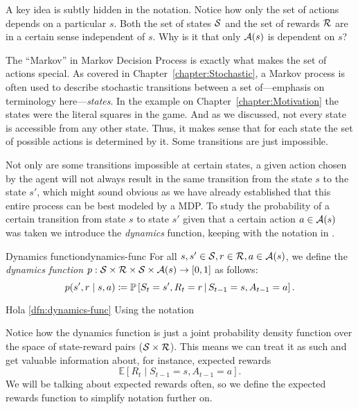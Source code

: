 A key idea is subtly hidden in the notation. Notice how only the set of actions
depends on a particular $s$. Both the set of states $\mathcal{S}$ and the set of
rewards $\mathcal{R}$ are in a certain sense independent of $s$. Why is it that
only $\mathcal{A}(s)$ is dependent on $s$?

The ``Markov'' in Markov Decision Process is exactly what makes the set of
actions special. As covered in Chapter~\ref{chapter:Stochastic}, a Markov
process is often used to describe stochastic transitions between a set 
of---emphasis on terminology here---\textit{states}. In the example on
Chapter~\ref{chapter:Motivation} the states were the literal squares in the
game. And as we discussed, not every state is accessible from any other state.
Thus, it makes sense that for each state the set of possible actions is
determined by it. Some transitions are just impossible.

Not only are some transitions impossible at certain states, a given action
chosen by the agent will not always result in the same transition from the state
$s$ to the state $s'$, which might sound obvious as we have already established
that this entire process can be best modeled by a MDP. To study the probability
of a certain transition from state $s$ to state $s'$ given that a certain action
$a \in \mathcal{A}(s)$ was taken we introduce the \textit{dynamics} function,
keeping with the notation in \cite{SuttonBarto}.

\begin{dfn}{Dynamics function}{dynamics-func}
	For all $s, s' \in \mathcal{S}, r \in \mathcal{R}, a \in 
	\mathcal{A}(s)$, we define the \emph{dynamics function} $p: 
	\mathcal{S} \times \mathcal{R} \times \mathcal{S} \times \mathcal{A}(s) 
	\to [0, 1]$ as follows:
	\begin{equation*}
		p(s', r \mid s, a) \coloneqq \mathbb{P}\left[S_t = s', R_t = r 
		\,\middle\vert\, S_{t-1} = s, A_{t-1} = a\right].
	\end{equation*}
\end{dfn}

Hola \ref{dfn:dynamics-func}
Using the notation 

Notice how the dynamics function is just a joint probability density function
over the space of state-reward pairs ($\mathcal{S} \times \mathcal{R}$). This means we
can treat it as such and get valuable information about, for instance, expected
rewards
\begin{equation*}
	\mathbb{E} \left[ R_t \mid S_{t-1} = s, A_{t-1} = a \right].
\end{equation*}
We will be talking about expected rewards often, so we define the expected
rewards function to simplify notation further on.

